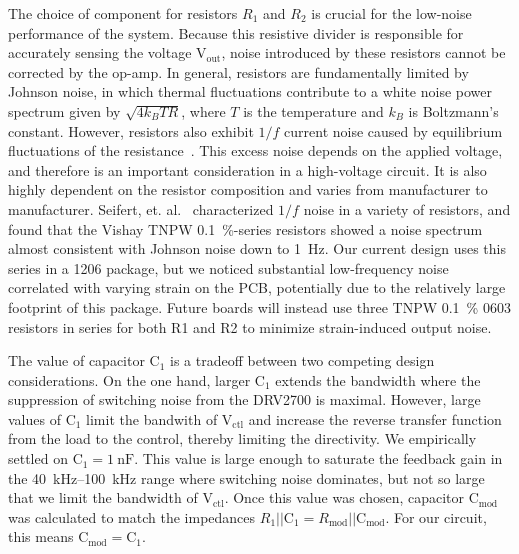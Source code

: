 \documentclass[aip,rsi,reprint]{revtex4-1} %
\begin{document}
The choice of component for resistors $R_1$ and $R_2$ is crucial for the low-noise performance of the system. 
Because this resistive divider is responsible for accurately sensing the voltage $\text{V}_\text{out}$, noise introduced by these resistors cannot be corrected by the op-amp.
In general, resistors are fundamentally limited by Johnson noise, in which thermal fluctuations contribute to a white noise power spectrum given by $\sqrt{4 k_B T R}$, where $T$ is the temperature and $k_B$ is Boltzmann's constant\cite{Horowitz1989a}.
However, resistors also exhibit $1/f$ current noise caused by equilibrium fluctuations of the resistance~\cite{Clarke1974a,Voss1976a}.
This excess noise depends on the applied voltage, and therefore is an important consideration in a high-voltage circuit.
It is also highly dependent on the resistor composition and varies from manufacturer to manufacturer.
Seifert, et. al.~\cite{Seifert2009a} characterized $1/f$ noise in a variety of resistors, and found that the Vishay TNPW \SI{0.1}{\percent}-series resistors showed a noise spectrum almost consistent with Johnson noise down to \SI{1}{\hertz}.
Our current design uses this series in a 1206 package, but we noticed substantial low-frequency noise correlated with varying strain on the PCB, potentially due to the relatively large footprint of this package.
Future boards will instead use three TNPW \SI{0.1}{\percent} 0603 resistors in series for both R1 and R2 to minimize strain-induced output noise.

The value of capacitor $\text{C}_1$ is a tradeoff between two competing design considerations.
On the one hand, larger $\text{C}_1$ extends the bandwidth where the suppression of switching noise from the DRV2700 is maximal.
However, large values of $\text{C}_1$ limit the bandwith of $\text{V}_\text{ctl}$ and increase the reverse transfer function from the load to the control, thereby limiting the directivity.
We empirically settled on $\text{C}_1 = \SI{1}{\nano\farad}$.
This value is large enough to saturate the feedback gain in the \SI{40}{\kilo\hertz}--\SI{100}{\kilo\hertz} range where switching noise dominates, but not so large that we limit the bandwidth of $\text{V}_\text{ctl}$.
Once this value was chosen, capacitor $\text{C}_\text{mod}$ was calculated to match the impedances $R_1||\text{C}_1=R_\text{mod}||\text{C}_\text{mod}$.
For our circuit, this means $\text{C}_\text{mod} = \text{C}_1$.
\end{document}
